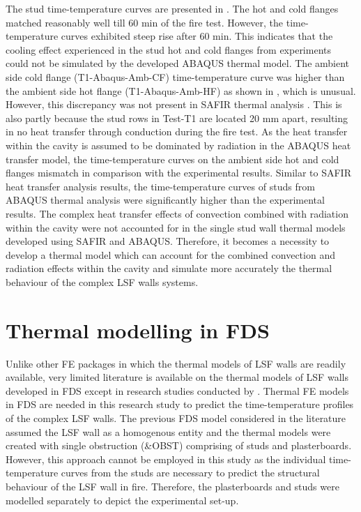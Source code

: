 The stud time-temperature curves are presented in . The hot and cold flanges matched reasonably well till 60 min of the fire test. However, the time-temperature curves exhibited steep rise after 60 min. This indicates that the cooling effect experienced in the stud hot and cold flanges from experiments could not be simulated by the developed ABAQUS thermal model. The ambient side cold flange (T1-Abaqus-Amb-CF) time-temperature curve was higher than the ambient side hot flange (T1-Abaqus-Amb-HF) as shown in , which is unusual. However, this discrepancy was not present in SAFIR thermal analysis . This is also partly because the stud rows in Test-T1 are located 20 mm apart, resulting in no heat transfer through conduction during the fire test. As the heat transfer within the cavity is assumed to be dominated by radiation in the ABAQUS heat transfer model, the time-temperature curves on the ambient side hot and cold flanges mismatch in comparison with the experimental results. Similar to SAFIR heat transfer analysis results, the time-temperature curves of studs from ABAQUS thermal analysis were significantly higher than the experimental results. The complex heat transfer effects of convection combined with radiation within the cavity were not accounted for in the single stud wall thermal models developed using SAFIR and ABAQUS. Therefore, it becomes a necessity to develop a thermal model which can account for the combined convection and radiation effects within the cavity and simulate more accurately the thermal behaviour of the complex LSF walls systems.

\section{Thermal modelling in FDS}

Unlike other FE packages in which the thermal models of LSF walls are readily available, very limited literature is available on the thermal models of LSF walls developed in FDS except in research studies conducted by \citet{Lazaro2016,Lazaro2018,Nguyen2018}. Thermal FE models in FDS are needed in this research study to predict the time-temperature profiles of the complex LSF walls. The previous FDS model considered in the literature assumed the LSF wall as a homogenous entity and the thermal models were created with single obstruction (\&OBST) comprising of studs and plasterboards. However, this approach cannot be employed in this study as the individual time-temperature curves from the studs are necessary to predict the structural behaviour of the LSF wall in fire. Therefore, the plasterboards and studs were modelled separately to depict the experimental set-up. 

